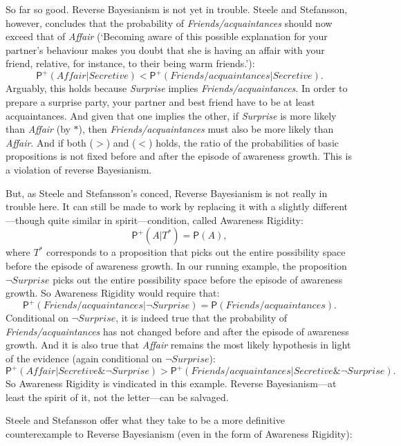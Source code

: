 \documentclass[
  11pt,
  dvipsnames,enabledeprecatedfontcommands]{scrartcl}
\newcommand{\pr}[1]{\ensuremath{\mathsf{P}(#1)}}
\newcommand{\ppr}[2]{\ensuremath{\mathsf{P}^{#1}(#2)}}
\begin{document}
So far so good. Reverse Bayesianism is not yet in trouble. Steele and
Stefansson, however, concludes that the probability of
\textit{Friends/acquaintances} should now exceed that of \textit{Affair}
(`Becoming aware of this possible explanation for your partner's
behaviour makes you doubt that she is having an affair with your friend,
relative, for instance, to their being warm friends.'):
\[\ppr{+}{\textit{Affair} \vert  \textit{Secretive} } < \ppr{+}{\textit{Friends/acquaintances} \vert \textit{Secretive}}. \tag{<}\]
Arguably, this holds because \textit{Surprise} implies
\textit{Friends/acquaintances}. In order to prepare a surprise party,
your partner and best friend have to be at least acquaintances. And
given that one implies the other, if \textit{Surprise} is more likely
than \textit{Affair} (by \(*\)), then \textit{Friends/acquaintances}
must also be more likely than \textit{Affair}. And if both (\(>\)) and
(\(<\)) holds, the ratio of the probabilities of basic propositions is
not fixed before and after the episode of awareness growth. This is a
violation of reverse Bayesianism.

But, as Steele and Stefansson's conced, Reverse Bayesianism is not
really in trouble here. It can still be made to work by replacing it
with a slightly different---though quite similar in spirit---condition,
called Awareness Rigidity: \[\ppr{+}{A \vert T^*}=\pr{A},\] where
\(T^*\) corresponds to a proposition that picks out the entire
possibility space before the episode of awareness growth. In our running
example, the proposition \(\neg\textit{Surprise}\) picks out the entire
possibility space before the episode of awareness growth. So Awareness
Rigidity would require that:
\[\ppr{+}{\textit{Friends/acquaintances} \vert \neg\textit{Surprise}}=\pr{\textit{Friends/acquaintances}}.\]
Conditional on \(\neg\textit{Surprise}\), it is indeed true that the
probability of \textit{Friends/acquaintances} has not changed before and
after the episode of awareness growth. And it is also true that
\textit{Affair} remains the most likely hypothesis in light of the
evidence (again conditional on \(\neg\textit{Surprise}\)):
\[\ppr{+}{\textit{Affair} \vert  \textit{Secretive} \& \neg\textit{Surprise} } > \ppr{+}{\textit{Friends/acquaintances} \vert \textit{Secretive} \& \neg\textit{Surprise}}. \tag{$>^+$}\]
So Awareness Rigidity is vindicated in this example. Reverse
Bayesianism---at least the spirit of it, not the letter---can be
salvaged.

Steele and Stefansson offer what they take to be a more definitive
counterexample to Reverse Bayesianism (even in the form of Awareness
Rigidity):
\end{document}
